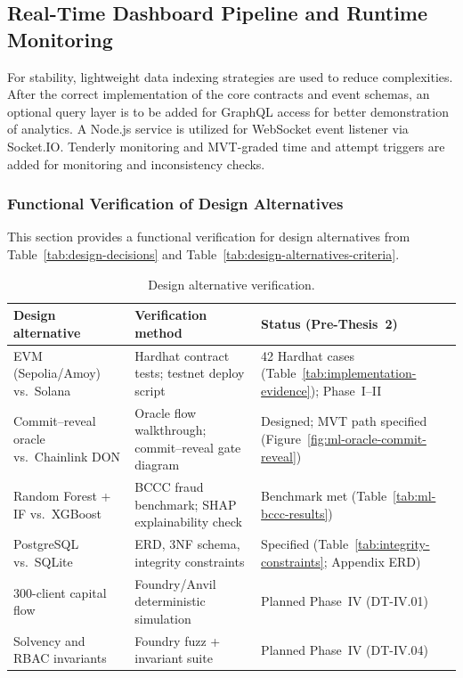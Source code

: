 \documentclass[12pt,a4paper]{report}
\newcommand{\tableheadcolor}{\rowcolor{TableHeadBg}}
\begin{document}
\subsection{Real-Time Dashboard Pipeline and Runtime Monitoring}
\label{sec:realtime}

For stability, lightweight data indexing strategies are used to reduce complexities. After the correct implementation of the core contracts and event schemas, an optional query layer is to be added for GraphQL access for better demonstration of analytics. A Node.js service is utilized for WebSocket event listener via Socket.IO. Tenderly monitoring and MVT-graded time and attempt triggers are added for monitoring and inconsistency checks.



\subsubsection{Functional Verification of Design Alternatives}
\label{sec:design-alternative-verification}

This section provides a functional verification for design alternatives from Table~\ref{tab:design-decisions} and Table~\ref{tab:design-alternatives-criteria}.

\begin{table}[H]
\centering
\caption[Design alternative verification]{Design alternative verification.}
\label{tab:design-alternative-verification}
\small
\begin{tabular}{@{}p{3.4cm}p{4.2cm}p{6.0cm}@{}}
\toprule
\tableheadcolor
\textbf{Design alternative} & \textbf{Verification method} & \textbf{Status (Pre-Thesis~2)} \\
\midrule
EVM (Sepolia/Amoy) vs.\ Solana & Hardhat contract tests; testnet deploy script & 42 Hardhat cases (Table~\ref{tab:implementation-evidence}); Phase~I--II \\
Commit--reveal oracle vs.\ Chainlink DON & Oracle flow walkthrough; commit--reveal gate diagram & Designed; MVT path specified (Figure~\ref{fig:ml-oracle-commit-reveal}) \\
Random Forest + IF vs.\ XGBoost & BCCC fraud benchmark; SHAP explainability check & Benchmark met (Table~\ref{tab:ml-bccc-results}) \\
PostgreSQL vs.\ SQLite & ERD, 3NF schema, integrity constraints & Specified (Table~\ref{tab:integrity-constraints}; Appendix ERD) \\
300-client capital flow & Foundry/Anvil deterministic simulation & Planned Phase~IV (DT-IV.01) \\
Solvency and RBAC invariants & Foundry fuzz + invariant suite & Planned Phase~IV (DT-IV.04) \\
\bottomrule
\end{tabular}
\end{table}
\end{document}
